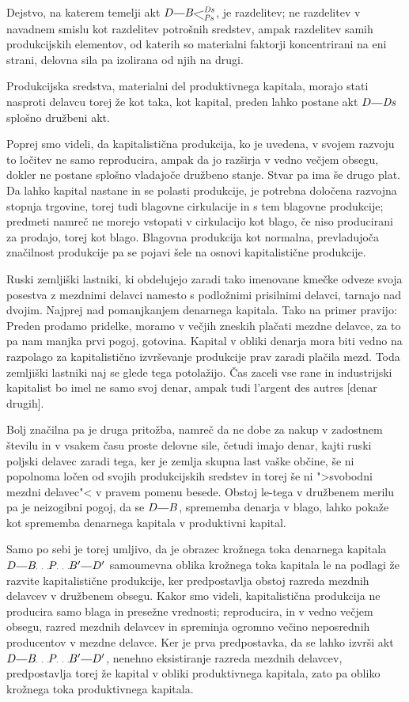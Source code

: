 \documentclass[kapital_02.tex]{subfiles}
\begin{document}
Dejstvo, na katerem temelji akt \(\KPED\KPEcrta\KPEBrazcepDsPs\), je razdelitev; ne razdelitev v navadnem smislu kot razdelitev potrošnih sredstev, ampak razdelitev samih produkcijskih elementov, od katerih so materialni faktorji koncentrirani na eni strani, delovna sila pa izolirana od njih na drugi.

Produkcijska sredstva, materialni del produktivnega kapitala, morajo stati nasproti delavcu torej že kot taka, kot kapital, preden lahko postane akt \(\KPED\KPEcrta\KPEDs\) splošno družbeni akt.

Poprej smo videli, da kapitalistična produkcija, ko je uvedena, v svojem razvoju to ločitev ne samo reproducira, ampak da jo razširja v vedno večjem obsegu, dokler ne postane splošno vladajoče družbeno stanje. Stvar pa ima še drugo plat. Da lahko kapital nastane in se polasti produkcije, je potrebna določena razvojna stopnja trgovine, torej tudi blagovne cirkulacije in s tem blagovne produkcije; predmeti namreč ne morejo vstopati v cirkulacijo kot blago, če niso producirani za prodajo, torej kot blago. Blagovna produkcija kot normalna, prevladujoča značilnost produkcije pa se pojavi šele na osnovi kapitalistične produkcije.

Ruski zemljiški lastniki, ki obdelujejo zaradi tako imenovane kmečke odveze svoja posestva z mezdnimi delavci namesto s podložnimi prisilnimi delavci, tarnajo nad dvojim. Najprej nad pomanjkanjem denarnega kapitala. Tako na primer pravijo: Preden prodamo pridelke, moramo v večjih zneskih plačati mezdne delavce, za to pa nam manjka prvi pogoj, gotovina. Kapital v obliki denarja mora biti vedno na razpolago za kapitalistično izvrševanje produkcije prav zaradi plačila mezd. Toda zemljiški lastniki naj se glede tega potolažijo. Čas zaceli vse rane in industrijski kapitalist bo imel ne samo svoj denar, ampak tudi l'argent des autres [denar drugih].

Bolj značilna pa je druga pritožba, namreč da ne dobe za nakup v zadostnem številu in v vsakem času proste delovne sile, četudi imajo denar, kajti ruski poljski delavec zaradi tega, ker je zemlja skupna last vaške občine, še ni popolnoma ločen od svojih produkcijskih sredstev in torej še ni ">svobodni mezdni delavec"< v pravem pomenu besede. Obstoj le-tega v družbenem merilu pa je neizogibni pogoj, da se \(\KPED\KPEcrta\KPEB\), sprememba denarja v blago, lahko pokaže kot sprememba denarnega kapitala v produktivni kapital.

Samo po sebi je torej umljivo, da je obrazec krožnega toka denarnega kapitala \(\KPED\KPEcrta\KPEB\KPEpike\KPEP\KPEpike\KPEB'\KPEcrta\KPED'\) samoumevna oblika krožnega toka kapitala le na podlagi že razvite kapitalistične produkcije, ker predpostavlja obstoj razreda mezdnih delavcev v družbenem obsegu. Kakor smo videli, kapitalistična produkcija ne producira samo blaga in presežne vrednosti; reproducira, in v vedno večjem obsegu, razred mezdnih delavcev in spreminja ogromno večino neposrednih producentov v mezdne delavce. Ker je prva predpostavka, da se lahko izvrši akt \(\KPED\KPEcrta\KPEB\KPEpike\KPEP\KPEpike\KPEB'\KPEcrta\KPED'\), nenehno eksistiranje razreda mezdnih delavcev, predpostavlja torej že kapital v obliki produktivnega kapitala, zato pa obliko krožnega toka produktivnega kapitala.
\end{document}
